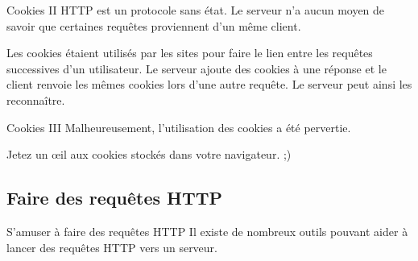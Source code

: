 \documentclass{beamer}
\begin{document}
\begin{frame}{Cookies II}
  HTTP est un protocole sans état. Le serveur n'a aucun moyen de savoir que certaines requêtes proviennent d'un même client.
  
  Les cookies étaient utilisés par les sites pour faire le lien entre les requêtes successives d'un utilisateur. Le serveur ajoute des cookies à une réponse et le client renvoie les mêmes cookies lors d'une autre requête. Le serveur peut ainsi les reconnaître.
\end{frame}

\begin{frame}{Cookies III}
Malheureusement, l'utilisation des cookies a été pervertie.

Jetez un \oe{}il aux cookies stockés dans votre navigateur. ;)
\end{frame}

\subsection{Faire des requêtes HTTP}
\begin{frame}{S'amuser à faire des requêtes HTTP}
Il existe de nombreux outils pouvant aider à lancer des requêtes HTTP vers un serveur.
\begin{itemize}
\end{itemize}
\end{frame}
\end{document}
